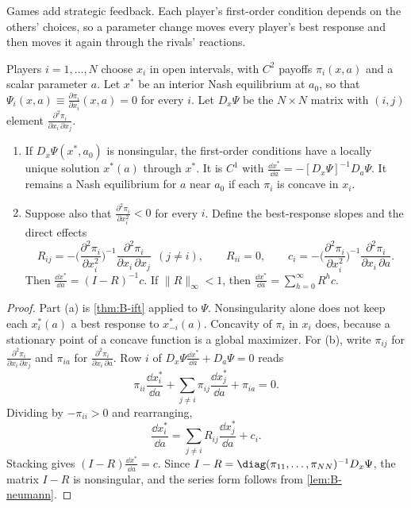 Games add strategic feedback. Each player's first-order condition depends on the others' choices, so a parameter
change moves every player's best response and then moves it again through the rivals' reactions.

\begin{proposition}\label{prop:B-cs-nash}
Players $i = 1, \dots, N$ choose $x_i$ in open intervals, with $C^2$ payoffs $\pi_i(x, a)$ and a scalar parameter $a$.
Let $x^*$ be an interior Nash equilibrium at $a_0$, so that $\Psi_i(x, a) \equiv \frac{\partial \pi_i}{\partial x_i}(x, a) = 0$
for every $i$. Let $D_x\Psi$ be the $N \times N$ matrix with $(i, j)$ element $\frac{\partial^2 \pi_i}{\partial x_i\,\partial x_j}$.
\begin{enumerate}[label=(\alph*)]
  \item If $D_x\Psi(x^*, a_0)$ is nonsingular, the first-order conditions have a locally unique solution $x^*(a)$
  through $x^*$. It is $C^1$ with $\frac{\dd x^*}{\dd a} = -[D_x\Psi]^{-1}D_a\Psi$. It remains a Nash equilibrium for $a$
  near $a_0$ if each $\pi_i$ is concave in $x_i$.
  \item Suppose also that $\frac{\partial^2 \pi_i}{\partial x_i^2} < 0$ for every $i$. Define the best-response slopes and the
  direct effects
  \begin{equation*}
  R_{ij} = -\Big(\frac{\partial^2 \pi_i}{\partial x_i^2}\Big)^{-1}\frac{\partial^2 \pi_i}{\partial x_i\,\partial x_j}\ \ (j \neq i),
  \qquad R_{ii} = 0 ,
  \qquad c_i = -\Big(\frac{\partial^2 \pi_i}{\partial x_i^2}\Big)^{-1}\frac{\partial^2 \pi_i}{\partial x_i\,\partial a} .
  \end{equation*}
  Then $\frac{\dd x^*}{\dd a} = (I - R)^{-1}c$. If $\|R\|_\infty < 1$, then
  $\frac{\dd x^*}{\dd a} = \sum_{h = 0}^{\infty}R^hc$.
\end{enumerate}
\end{proposition}

\begin{proof}
Part (a) is \cref{thm:B-ift} applied to $\Psi$. Nonsingularity alone does not keep each $x_i^*(a)$ a best response
to $x_{-i}^*(a)$. Concavity of $\pi_i$ in $x_i$ does, because a stationary point of a concave function is a global
maximizer. For (b), write $\pi_{ij}$ for $\frac{\partial^2 \pi_i}{\partial x_i\,\partial x_j}$ and
$\pi_{ia}$ for $\frac{\partial^2 \pi_i}{\partial x_i\,\partial a}$. Row $i$ of $D_x\Psi\frac{\dd x^*}{\dd a} + D_a\Psi = 0$ reads
\begin{equation*}
\pi_{ii}\frac{\dd x_i^*}{\dd a} + \sum_{j \neq i}\pi_{ij}\frac{\dd x_j^*}{\dd a} + \pi_{ia} = 0 .
\end{equation*}
Dividing by $-\pi_{ii} > 0$ and rearranging,
\begin{equation*}
\frac{\dd x_i^*}{\dd a} = \sum_{j \neq i}R_{ij}\frac{\dd x_j^*}{\dd a} + c_i .
\end{equation*}
Stacking gives $(I - R)\frac{\dd x^*}{\dd a} = c$. Since $I - R = \diag(\pi_{11}, \dots, \pi_{NN})^{-1}D_x\Psi$, the matrix
$I - R$ is nonsingular, and the series form follows from \cref{lem:B-neumann}.
\end{proof}

